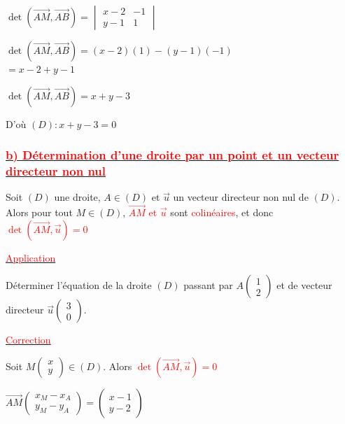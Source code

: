 \documentclass[12pt,a4paper]{article}
\begin{document}
$\det(\overrightarrow{AM}, \overrightarrow{AB}) = \begin{vmatrix} x - 2 & -1 \\ y - 1 & 1 \end{vmatrix}$

$\det(\overrightarrow{AM}, \overrightarrow{AB}) = (x - 2)(1) - (y - 1)(-1)$ \\
\indent \enspace \qquad \qquad $= x - 2 + y - 1$

$\det(\overrightarrow{AM}, \overrightarrow{AB}) = x + y - 3$

\noindent D'où $(D) : \boxed{x + y - 3 = 0}$

\subsubsection*{\underline{\textcolor{red}{b) Détermination d'une droite par un point et un vecteur directeur non nul}}}

Soit $(D)$ une droite, $A \in (D)$ et $\vec{u}$ un vecteur directeur non nul de $(D)$. Alors pour tout $M \in (D)$, \textcolor{red}{$\overrightarrow{AM}$ et $\vec{u}$} sont \textcolor{red}{colinéaires}, et donc \textcolor{red}{$\det(\overrightarrow{AM}, \vec{u}) = 0$}

\begin{center}
    \underline{\textcolor{red}{Application}}
\end{center}

\noindent Déterminer l'équation de la droite $(D)$ passant par $A \begin{pmatrix} 1 \\ 2 \end{pmatrix}$ et de vecteur directeur $\vec{u} \begin{pmatrix} 3 \\ 0 \end{pmatrix}$.

\begin{center}
    \underline{\textcolor{red}{Correction}}
\end{center}

\noindent Soit $M \begin{pmatrix} x \\ y \end{pmatrix} \in (D)$. Alors \textcolor{red}{$\det(\overrightarrow{AM}, \vec{u}) = 0$}

$\overrightarrow{AM} \begin{pmatrix} x_M - x_A \\ y_M - y_A \end{pmatrix} = \begin{pmatrix} x - 1 \\ y - 2 \end{pmatrix}$
\end{document}
